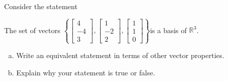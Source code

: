 
\begin{exerciseStatement}


Consider the statement 
\begin{center}\begin{minipage}{0.8\textwidth}
 The set of vectors \( \left\{ \left[\begin{array}{c}
4 \\
-4 \\
3
\end{array}\right] , \left[\begin{array}{c}
1 \\
-2 \\
2
\end{array}\right] , \left[\begin{array}{c}
1 \\
1 \\
0
\end{array}\right] \right\} \)is a basis of \(\mathbb{R}^3\). 
\end{minipage}\end{center}
    


\begin{enumerate}[(a)]
\item  Write an equivalent statement in terms of other vector properties.
\item  Explain why your statement is true or false.
\end{enumerate}
    
\end{exerciseStatement}
    
